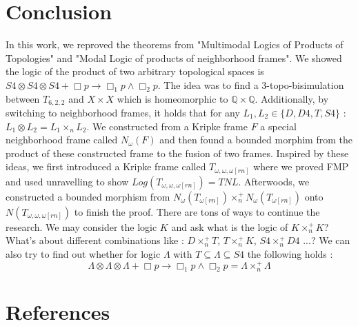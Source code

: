 \documentclass[12pt, a4paper]{scrartcl}
\begin{document}
\section{Conclusion}
    In this work, we reproved the theorems from "Multimodal Logics of Products of Topologies"
    and "Modal Logic of products of neighborhood frames". We showed the logic of the product
    of two arbitrary topological spaces is $S4 \otimes S4 \otimes S4 + \Box p \rightarrow \Box_1 p \land \Box_2 p$.
    The idea was to find a 3-topo-bisimulation between $T_{6,2,2}$ and $X \times X$ which is homeomorphic to $\mathbb{Q} \times \mathbb{Q}$.
    Additionally, by switching to neighborhood frames, it holds that for any $L_1, L_2 \in \{D,D4,T,S4\}$ :
    $L_1 \otimes L_2 = L_1 \times_n L_2$. We constructed from a Kripke frame $F$ a special neighborhood frame called $N_\omega(F)$ and then found
    a bounded morphim from the product of these constructed frame to the fusion of two frames.
    Inspired by these ideas, we first introduced a Kripke frame called $T_{\omega,\omega,\omega[rn]}$ where we proved FMP and used unravelling to show
    $Log(T_{\omega,\omega,\omega[rn]}) = \mathit{TNL}$. Afterwoods, we constructed a bounded morphism from 
    $N_\omega(T_{\omega[rn]}) \times^+_n N_\omega(T_{\omega[rn]})$ onto  $N(T_{\omega,\omega,\omega[rn]})$ to finish the proof. \newline \newline
    There are tons of ways to continue the research. We may consider the logic $K$ and ask what is the logic of
    $K \times^+_n K$? What's about different combinations like :
    $D \times^+_n T$, $T \times^+_n K$, $S4 \times^+_n D4$ ...? 
    We can also try to find out whether for logic $\Lambda$ with $T \subseteq \Lambda \subseteq S4$ the following holds :
    $$\Lambda \otimes \Lambda \otimes \Lambda + \Box p \rightarrow \Box_1 p \land \Box_2 p = \Lambda \times^+_n \Lambda$$


\clearpage
\section*{References}
\end{document}
